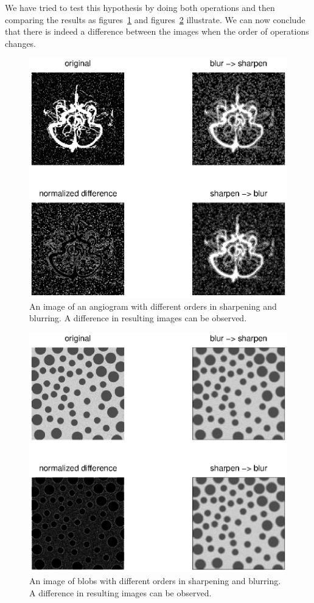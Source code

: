 We have tried to test this hypothesis by doing both operations and then comparing the results as figures~\ref{fig:angios} and figures~\ref{fig:blobs} illustrate.
We can now conclude that there is indeed a difference between the images when the order of operations changes. 
\begin{figure}[!Htb]
 \centering
 \includegraphics{angios.eps}
 \caption{An image of an angiogram with different orders in sharpening and blurring. A difference in resulting images can be observed. }
 \label{fig:angios}
\end{figure}
\begin{figure}[!Htb]
 \centering
 \includegraphics{blobs.eps}
 \caption{An image of blobs with different orders in sharpening and blurring. A difference in resulting images can be observed.}
 \label{fig:blobs}
\end{figure}
\clearpage
